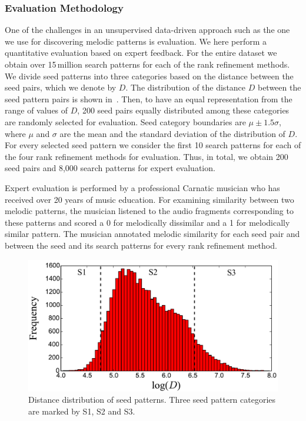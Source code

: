 

\subsubsection{Evaluation Methodology}
\label{sec:evaluationmethodology}

One of the challenges in an unsupervised data-driven approach such as the one we use for discovering melodic patterns is evaluation. We here perform a quantitative evaluation based on expert feedback. For the entire dataset we obtain over 15\,million search patterns for each of the rank refinement methods. We divide seed patterns into three categories based on the distance between the seed pairs, which we denote by $D$. The distribution of the distance $D$ between the seed pattern pairs is shown in~. Then, to have an equal representation from the range of values of $D$, 200 seed pairs equally distributed among these categories are randomly selected for evaluation. Seed category boundaries are $\mu \pm 1.5\sigma$, where $\mu$ and $\sigma$ are the mean and the standard deviation of the distribution of $D$. For every selected seed pattern we consider the first 10 search patterns for each of the four rank refinement methods for evaluation. Thus, in total, we obtain 200 seed pairs and 8,000 search patterns for expert evaluation.

Expert evaluation is performed by a professional Carnatic musician who has received over 20 years of music education. For examining similarity between two melodic patterns, the musician listened to the audio fragments corresponding to these patterns and scored a 0 for melodically dissimilar and a 1 for melodically similar pattern. The musician annotated melodic similarity for each seed pair and between the seed and its search patterns for every rank refinement method.


\begin{figure}
	\begin{center}
		\includegraphics[width=\figSizeEightyFive]{ch06_patterns/figures/discovery/SeedDistribution.pdf}
	\end{center}
	\caption{Distance distribution of seed patterns. Three seed pattern categories are marked by S1, S2 and S3.}
	\label{fig:SeedPatternsDistanceDistribution}
\end{figure}


